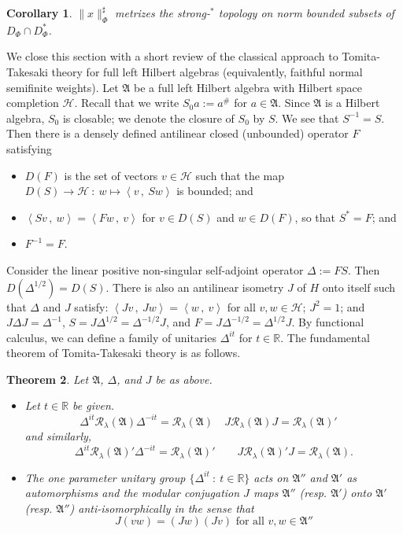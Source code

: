 \documentclass[12pt]{amsart}
\newtheorem{thm}{Theorem}[section]
\newtheorem{cor}[thm]{Corollary}
\theoremstyle{definition}
\def\cal{\mathcal}
\newcommand\ip[2]{\left\langle #1\, ,\!\ #2 \right\rangle}
\newcommand\R{{\cal R}}
\def \bbR{\mathbb{R}}
\begin{document}
\begin{cor}\label{SharpMetrize}
    $\|x\|_\Phi^\sharp$ metrizes the strong-$^*$ topology on norm bounded subsets of $D_\Phi \cap D_\Phi^*$.
\end{cor}

We close this section with a short review of the classical approach to Tomita-Takesaki theory for full left Hilbert algebras (equivalently, faithful normal semifinite weights).  Let $\mathfrak{A}$ be a full left Hilbert algebra with Hilbert space completion $\cal H$.  Recall that we write $S_0 a := a^\#$ for $a \in \mathfrak{A}$.  Since $\mathfrak{A}$ is a Hilbert algebra, $S_0$ is closable; we denote the closure of $S_0$ by $S$. We see that $S^{-1} = S$. Then there is a densely defined antilinear closed (unbounded) operator $F$ satisfying
\begin{itemize}
    \item $D(F)$ is the set of vectors $v \in \cal H$ such that the map $D(S) \to \cal H \ : \ w \mapsto \ip{v}{Sw}$ is bounded; and 
    \item $\ip{Sv}{w} = \ip{Fw}{v}$ for $v \in D(S)$ and $w \in D(F)$, so that $S^* = F$; and
    \item $F^{-1} = F$.
\end{itemize} 

Consider the linear positive non-singular self-adjoint operator $\Delta := FS$. Then $D(\Delta^{1/2}) = D(S)$. There is also an antilinear isometry $J$ of $H$ onto itself such that $\Delta$ and $J$ satisfy: $\ip{Jv}{Jw} = \ip{w}{v}$ for all $v,w \in \cal H$; $J^2 = 1$; and $J\Delta J = \Delta^{-1}$, $S = J\Delta^{1/2} = \Delta^{-1/2}J$, and $F = J\Delta^{-1/2} = \Delta^{1/2}J$.  By functional calculus, we can define a family of unitaries $\Delta^{it}$ for $t \in \bbR$. The fundamental theorem of Tomita-Takesaki theory is as follows.

\begin{thm}{\cite[Chapter VI, Theorem 1.19]{Takesaki}}\label{TomitaFund}
    Let $\mathfrak{A}$, $\Delta$, and $J$ be as above. 
    
    \begin{itemize}
        \item Let $t \in \bbR$ be given.
        \[
        \Delta^{it} \R_{\lambda}(\mathfrak{A})\Delta^{-it} = \R_{\lambda}(\mathfrak{A}) \quad J \R_{\lambda}(\mathfrak{A}) J = \R_{\lambda}(\mathfrak{A})' \quad 
        \]
        and similarly,
        \[
        \Delta^{it} \R_{\lambda}(\mathfrak{A})'\Delta^{-it} = \R_{\lambda}(\mathfrak{A})' \qquad J \R_{\lambda}(\mathfrak{A})' J = \R_{\lambda}(\mathfrak{A}).
        \]
        \item The one parameter unitary group $\{ \Delta^{it} \ : \ t \in \bbR\}$ acts on $\mathfrak{A}''$ and $\mathfrak{A}'$ as automorphisms and the modular conjugation $J$ maps $\mathfrak{A}''$ (resp. $\mathfrak{A}'$) onto $\mathfrak{A}'$ (resp. $\mathfrak{A}''$) anti-isomorphically in the sense that 
        \[
        J(vw) = (Jw)(Jv) \text{ for all } v,w \in \mathfrak{A}''
        \]
    \end{itemize}
\end{thm}
\end{document}
